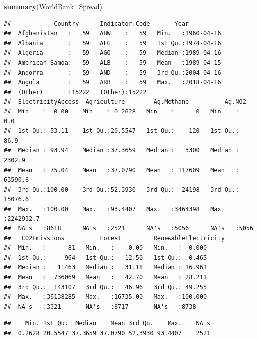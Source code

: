 \documentclass[12pt,]{article}
\newenvironment{Shaded}{\begin{snugshade}}{\end{snugshade}}
\newcommand{\KeywordTok}[1]{\textcolor[rgb]{0.13,0.29,0.53}{\textbf{#1}}}
\newcommand{\OperatorTok}[1]{\textcolor[rgb]{0.81,0.36,0.00}{\textbf{#1}}}
\newcommand{\NormalTok}[1]{#1}
\begin{document}
\begin{Shaded}
\begin{Highlighting}[]
\KeywordTok{summary}\NormalTok{(WorldBank_Spread)}
\end{Highlighting}
\end{Shaded}

\begin{verbatim}
##            Country      Indicator.Code       Year           
##  Afghanistan   :   59   ABW    :   59   Min.   :1960-04-16  
##  Albania       :   59   AFG    :   59   1st Qu.:1974-04-16  
##  Algeria       :   59   AGO    :   59   Median :1989-04-16  
##  American Samoa:   59   ALB    :   59   Mean   :1989-04-15  
##  Andorra       :   59   AND    :   59   3rd Qu.:2004-04-16  
##  Angola        :   59   ARB    :   59   Max.   :2018-04-16  
##  (Other)       :15222   (Other):15222                       
##  ElectricityAccess  Agriculture        Ag.Methane          Ag.NO2         
##  Min.   :  0.00    Min.   : 0.2628   Min.   :      0   Min.   :      0.0  
##  1st Qu.: 53.11    1st Qu.:20.5547   1st Qu.:    120   1st Qu.:     86.9  
##  Median : 93.94    Median :37.3659   Median :   3300   Median :   2302.9  
##  Mean   : 75.04    Mean   :37.0790   Mean   : 117609   Mean   :  63590.8  
##  3rd Qu.:100.00    3rd Qu.:52.3930   3rd Qu.:  24198   3rd Qu.:  15076.6  
##  Max.   :100.00    Max.   :93.4407   Max.   :3464398   Max.   :2242932.7  
##  NA's   :8618      NA's   :2521      NA's   :5056      NA's   :5056       
##   CO2Emissions          Forest         RenewableElectricity
##  Min.   :     -81   Min.   :    0.00   Min.   :  0.000     
##  1st Qu.:     964   1st Qu.:   12.50   1st Qu.:  0.465     
##  Median :   11463   Median :   31.18   Median : 16.961     
##  Mean   :  736069   Mean   :   42.70   Mean   : 28.211     
##  3rd Qu.:  143107   3rd Qu.:   46.96   3rd Qu.: 49.255     
##  Max.   :36138285   Max.   :16735.00   Max.   :100.000     
##  NA's   :3321       NA's   :8717       NA's   :8738
\end{verbatim}

\begin{Shaded}
\end{Shaded}

\begin{verbatim}
##    Min. 1st Qu.  Median    Mean 3rd Qu.    Max.    NA's 
##  0.2628 20.5547 37.3659 37.0790 52.3930 93.4407    2521
\end{verbatim}
\end{document}

